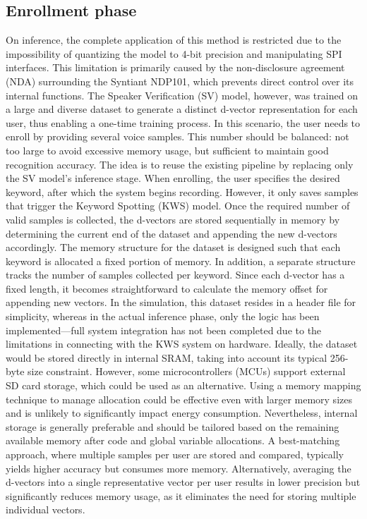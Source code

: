 \subsection{Enrollment phase}
\label{subsec:enrollment} 
On inference, the complete application of this method is restricted due to the impossibility of quantizing the model to 4-bit precision and manipulating SPI interfaces. This limitation is primarily caused by the non-disclosure agreement (NDA) surrounding the Syntiant NDP101, which prevents direct control over its internal functions. The Speaker Verification (SV) model, however, was trained on a large and diverse dataset to generate a distinct d-vector representation for each user, thus enabling a one-time training process. In this scenario, the user needs to enroll by providing several voice samples. This number should be balanced: not too large to avoid excessive memory usage, but sufficient to maintain good recognition accuracy. The idea is to reuse the existing pipeline by replacing only the SV model’s inference stage. When enrolling, the user specifies the desired keyword, after which the system begins recording. However, it only saves samples that trigger the Keyword Spotting (KWS) model. Once the required number of valid samples is collected, the d-vectors are stored sequentially in memory by determining the current end of the dataset and appending the new d-vectors accordingly.
The memory structure for the dataset is designed such that each keyword is allocated a fixed portion of memory. In addition, a separate structure tracks the number of samples collected per keyword. Since each d-vector has a fixed length, it becomes straightforward to calculate the memory offset for appending new vectors. In the simulation, this dataset resides in a header file for simplicity, whereas in the actual inference phase, only the logic has been implemented—full system integration has not been completed due to the limitations in connecting with the KWS system on hardware. Ideally, the dataset would be stored directly in internal SRAM, taking into account its typical 256-byte size constraint. However, some microcontrollers (MCUs) support external SD card storage, which could be used as an alternative. Using a memory mapping technique to manage allocation could be effective even with larger memory sizes and is unlikely to significantly impact energy consumption. Nevertheless, internal storage is generally preferable and should be tailored based on the remaining available memory after code and global variable allocations. A best-matching approach, where multiple samples per user are stored and compared, typically yields higher accuracy but consumes more memory. Alternatively, averaging the d-vectors into a single representative vector per user results in lower precision but significantly reduces memory usage, as it eliminates the need for storing multiple individual vectors.
